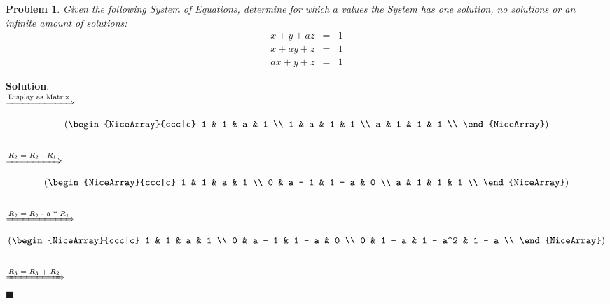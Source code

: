 \documentclass[12pt]{article}
\renewcommand{\=}[1]{\stackrel{#1}{=}} %
\newtheorem{p}{Problem}[section]
\theoremstyle{definition}
\newenvironment{s}{%
        \begin{trivlist} \item \textbf{Solution}. }{%
            \hspace*{\fill} $\blacksquare$\end{trivlist}}%
\begin{document}
\begin{p}
  \emph{Given the following System of Equations, determine for which $a$ values the System has one solution, no solutions or an infinite amount of solutions:} \\

  \[
    \begin{array}{lcl} 
    x + y + az & = & 1 \\
    x + ay + z & = & 1 \\
    ax + y + z & = & 1  
    \end{array}
  \]
\end{p}
\begin{s} \newline \\
  $\xRightarrow{\text{Display as Matrix}}$
  \\
     
  \[
    \left(\begin{NiceArray}{ccc|c}
      1 & 1 & a & 1 \\
      1 & a & 1  & 1 \\
      a & 1 & 1  & 1 \\
    \end{NiceArray} \right)
  \]
  \\
  
  $\xRightarrow{\text{$R_2$ = $R_2$ - $R_1$}}$
  \\
     
  \[
    \left(\begin{NiceArray}{ccc|c}
      1 & 1 & a & 1 \\
      0 & a - 1 & 1 - a & 0 \\
      a & 1 & 1  & 1 \\
    \end{NiceArray} \right)
  \]
  \\

  $\xRightarrow{\text{$R_3$ = $R_3$ - a * $R_1$}}$
  \\
     
  \[
    \left(\begin{NiceArray}{ccc|c}
      1 & 1 & a & 1 \\
      0 & a - 1 & 1 - a & 0 \\
      0 & 1 - a & 1 - a^2 & 1 - a \\
    \end{NiceArray} \right)
  \]
  \\
  $\xRightarrow{\text{$R_3$ = $R_3$ + $R_2$}}$
  \\


\end{s}
\end{document}
